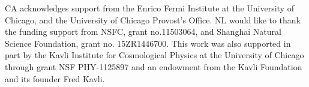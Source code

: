 \documentclass{emulateapj}
\begin{document}
\acknowledgments CA acknowledges support from the Enrico Fermi
Institute at the University of Chicago, and the University of Chicago
Provost's Office. NL would like to thank the funding support from
NSFC, grant no.11503064, and Shanghai Natural Science Foundation,
grant no. 15ZR1446700. This work was also supported in part by the
Kavli Institute for Cosmological Physics at the University of Chicago
through grant NSF PHY-1125897 and an endowment from the Kavli
Foundation and its founder Fred Kavli.
\lastpagefootnotes




\end{document}

